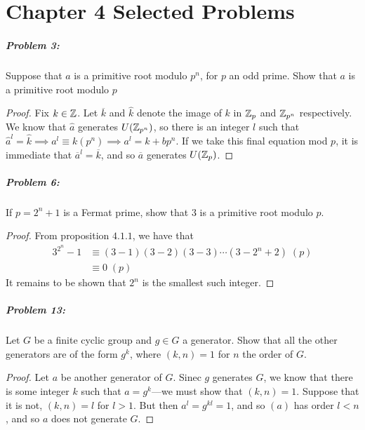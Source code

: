 \chapter*{Chapter 4 Selected Problems}

\paragraph{Problem 3:}
Suppose that \(a\) is a primitive root modulo \(p^n\), for \(p\) an odd prime.
Show that \(a\) is a primitive root modulo \(p\)

\begin{proof}
  Fix \(k \in \mathbb{Z} \). Let \(\overline{k}\) and \(\hat{k}\) denote the image of
  \(k\) in \(\mathbb{Z} _p\) and \(\mathbb{Z} _{p^n}\) respectively. We know that \(\hat{a}\)
  generates \(U(\mathbb{Z}_{p^n})\), so there is an integer \(l\) such that
  \(\hat{a}^l = \hat{k} \implies a^l \equiv k (p^n) \implies  a^l = k + bp^n\).
  If we take this final equation mod \(p\), it is immediate that
  \(\overline{a}^l=\overline{k}\), and so \(\overline{a}\) generates \(U(\mathbb{Z}_p)\).
\end{proof}

\paragraph{Problem 6:}
If \(p=2^n+1\) is a Fermat prime, show that 3 is a primitive root modulo \(p\).

\begin{proof}
  From proposition \(4.1.1\), we have that
  \begin{align*}
    3^{2^n}-1  &\equiv (3-1)(3-2)(3-3)\cdots(3-2^{n}+2) \; (p) \\
              &\equiv 0 \; (p)
  \end{align*}
  It remains to be shown that \(2^n\) is the smallest such integer.
\end{proof}

\paragraph{Problem 13:}
Let \(G\) be a finite cyclic group and \(g \in G\) a generator. Show that all
the other generators are of the form \(g^k\), where \((k,n)=1\) for \(n\) the
order of \(G\).

\begin{proof}
  Let \(a\) be another generator of \(G\). Sinec \(g\) generates \(G\), we know
  that there is some integer \(k\) such that \(a=g^k\)---we must show that
  \((k,n)=1\). Suppose that it is not, \ie \((k,n)=l\) for \(l>1\). But then
  \(a^l=g^{kl}=1\), and so \((a)\) has order \(l<n\), and so \(a\) does not
  generate \(G\).
\end{proof}

